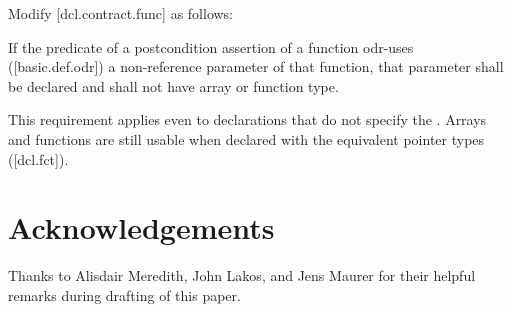 Modify [dcl.contract.func] as follows:

\begin{adjustwidth}{0.5cm}{0.5cm}
If the predicate of a postcondition assertion of a function odr-uses ([basic.def.odr]) a
non-reference parameter of that function, that parameter shall be declared  and shall not have array or function type.
\begin{note}
This requirement applies even to declarations
that do not specify the . Arrays and functions are still usable when declared with the equivalent pointer types ([dcl.fct]).
\end{note}
\begin{example}
\tcode{[...]}
\end{example}

\end{adjustwidth}


\section*{Acknowledgements}
Thanks to Alisdair Meredith, John Lakos, and Jens Maurer for their helpful remarks during drafting of this paper.


\renewcommand{\addcontentsline}[3]{}%







